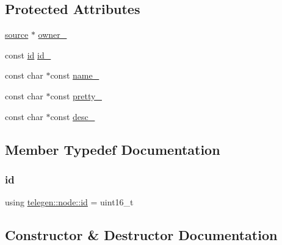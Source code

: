 \subsection*{Protected Attributes}
\begin{DoxyCompactItemize}
\item 
\hyperlink{classtelegen_1_1source}{source} $\ast$ \hyperlink{classtelegen_1_1node_ab97909f583b8777e9b95f11edfc869a8}{owner\+\_\+}
\item 
const \hyperlink{classtelegen_1_1node_aae3ff0d12932c55fdc88a1743e27ea56}{id} \hyperlink{classtelegen_1_1node_a0f485aa38b6a5a1e0ca55fd1f493e141}{id\+\_\+}
\item 
const char $\ast$const \hyperlink{classtelegen_1_1node_abb59d672031a10b796e44d628bb835be}{name\+\_\+}
\item 
const char $\ast$const \hyperlink{classtelegen_1_1node_abfa84da09528702afb75b46771ab9dcd}{pretty\+\_\+}
\item 
const char $\ast$const \hyperlink{classtelegen_1_1node_ab9842f580e8e37753a42565793a455fc}{desc\+\_\+}
\end{DoxyCompactItemize}


\subsection{Member Typedef Documentation}
\mbox{\label{classtelegen_1_1node_aae3ff0d12932c55fdc88a1743e27ea56}} 
\subsubsection{\texorpdfstring{id}{id}}
{\footnotesize\ttfamily using \hyperlink{classtelegen_1_1node_aae3ff0d12932c55fdc88a1743e27ea56}{telegen\+::node\+::id} =  uint16\+\_\+t}



\subsection{Constructor \& Destructor Documentation}
\mbox{\label{classtelegen_1_1node_ae046ceb8c032f5655160173c0777dba8}} 
